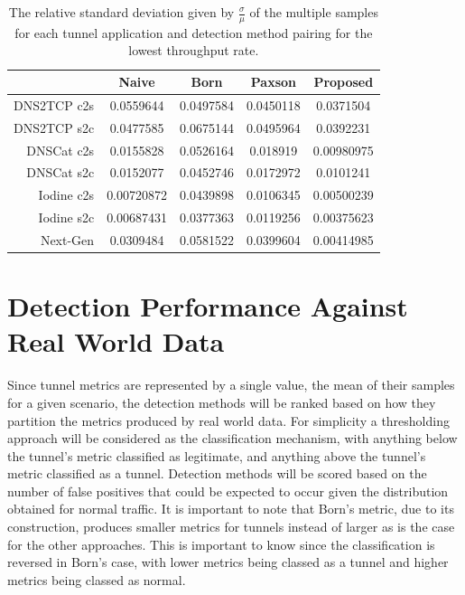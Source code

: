 \documentclass[12pt]{report}
\theoremstyle{remark}
\theoremstyle{definition}
\theoremstyle{definition}
\theoremstyle{definition}
\begin{document}
\begin{table}
\centering
\begin{tabular}{ r|cccc }
& Naive & Born & Paxson & Proposed \\
\hline
DNS2TCP c2s & 0.0559644 & 0.0497584 & 0.0450118 & 0.0371504 \\
DNS2TCP s2c & 0.0477585 & 0.0675144 & 0.0495964 & 0.0392231 \\
DNSCat c2s & 0.0155828 & 0.0526164 & 0.018919 & 0.00980975 \\
DNSCat s2c & 0.0152077 & 0.0452746 & 0.0172972 & 0.0101241 \\
Iodine c2s & 0.00720872 & 0.0439898 & 0.0106345 & 0.00500239 \\
Iodine s2c & 0.00687431 & 0.0377363 & 0.0119256 & 0.00375623 \\
Next-Gen & 0.0309484 & 0.0581522 & 0.0399604 & 0.00414985 \\
\end{tabular}
\caption[Relative Standard Deviation of Lowest Throughput Tunnel by Detection Method and Tunnel Application]{The relative standard deviation given by $\frac{\sigma}{\mu}$ of the multiple samples for each tunnel application and detection method pairing for the lowest throughput rate.}
\label{rsd-minimum}
\end{table}

\section{Detection Performance Against Real World Data}
\label{detection-perf}

Since tunnel metrics are represented by a single value, the mean of their
samples for a given scenario, the detection methods will be ranked based on how
they partition the metrics produced by real world data. For simplicity a
thresholding approach will be considered as the classification mechanism, with
anything below the tunnel's metric classified as legitimate, and anything above
the tunnel's metric classified as a tunnel. Detection methods will be scored
based on the number of false positives that could be expected to occur given the
distribution obtained for normal traffic. It is important to note that Born's
metric, due to its construction, produces smaller metrics for tunnels instead of
larger as is the case for the other approaches. This is important to know since
the classification is reversed in Born's case, with lower metrics being classed
as a tunnel and higher metrics being classed as normal.
\end{document}
